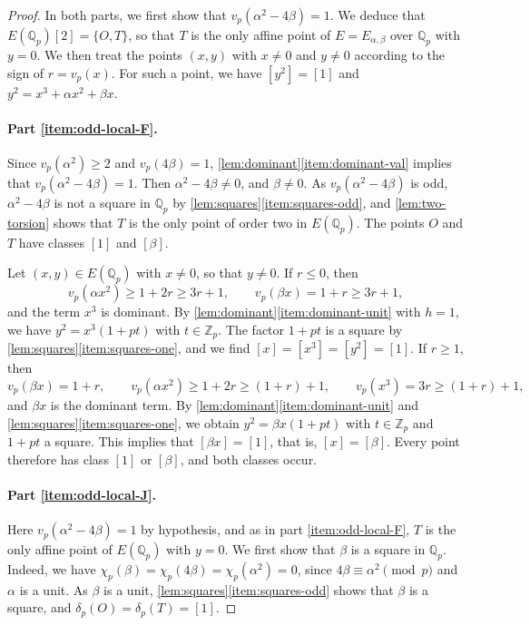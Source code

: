 \documentclass[12pt,oneside,openany]{book}
\theoremstyle{definition}
\theoremstyle{plain}
\numberwithin{equation}{chapter}
\theoremstyle{plain}
\theoremstyle{definition}
\theoremstyle{remark}
\newcommand{\Q}{\mathbb Q}
\newcommand{\Z}{\mathbb Z}
\newcommand{\sq}[1]{[#1]}
\begin{document}
\begin{proof}
In both parts, we first show that $v_p(\alpha^2-4\beta)=1$. We deduce that $E(\Q_p)[2]=\{O,T\}$, so that $T$ is the only affine point of $E=E_{\alpha,\beta}$ over $\Q_p$ with $y=0$. We then treat the points $(x,y)$ with $x\ne0$ and $y\ne0$ according to the sign of $r=v_p(x)$. For such a point, we have $\sq{y^2}=\sq1$ and $y^2=x^3+\alpha x^2+\beta x$.

\paragraph{Part \ref{item:odd-local-F}.} Since $v_p(\alpha^2)\ge2$ and $v_p(4\beta)=1$, \cref{lem:dominant}\ref{item:dominant-val} implies that $v_p(\alpha^2-4\beta)=1$. Then $\alpha^2-4\beta\ne0$, and $\beta\ne0$. As $v_p(\alpha^2-4\beta)$ is odd, $\alpha^2-4\beta$ is not a square in $\Q_p$ by \cref{lem:squares}\ref{item:squares-odd}, and \cref{lem:two-torsion} shows that $T$ is the only point of order two in $E(\Q_p)$. The points $O$ and $T$ have classes $\sq1$ and $\sq\beta$.

Let $(x,y)\in E(\Q_p)$ with $x\ne0$, so that $y\ne0$. If $r\le0$, then
\begin{equation}
v_p(\alpha x^2)\ge1+2r\ge3r+1,\qquad v_p(\beta x)=1+r\ge3r+1,
\end{equation}
and the term $x^3$ is dominant. By \cref{lem:dominant}\ref{item:dominant-unit} with $h=1$, we have $y^2=x^3(1+pt)$ with $t\in\Z_p$. The factor $1+pt$ is a square by \cref{lem:squares}\ref{item:squares-one}, and we find $\sq x=\sq{x^3}=\sq{y^2}=\sq1$. If $r\ge1$, then
\begin{equation}
v_p(\beta x)=1+r,\qquad v_p(\alpha x^2)\ge1+2r\ge(1+r)+1,\qquad v_p(x^3)=3r\ge(1+r)+1,
\end{equation}
and $\beta x$ is the dominant term. By \cref{lem:dominant}\ref{item:dominant-unit} and \cref{lem:squares}\ref{item:squares-one}, we obtain $y^2=\beta x(1+pt)$ with $t\in\Z_p$ and $1+pt$ a square. This implies that $\sq{\beta x}=\sq1$, that is, $\sq x=\sq\beta$. Every point therefore has class $\sq1$ or $\sq\beta$, and both classes occur.

\paragraph{Part \ref{item:odd-local-J}.} Here $v_p(\alpha^2-4\beta)=1$ by hypothesis, and as in part \ref{item:odd-local-F}, $T$ is the only affine point of $E(\Q_p)$ with $y=0$. We first show that $\beta$ is a square in $\Q_p$. Indeed, we have $\chi_p(\beta)=\chi_p(4\beta)=\chi_p(\alpha^2)=0$, since $4\beta\equiv\alpha^2\pmod p$ and $\alpha$ is a unit. As $\beta$ is a unit, \cref{lem:squares}\ref{item:squares-odd} shows that $\beta$ is a square, and $\delta_p(O)=\delta_p(T)=\sq1$.


\end{proof}
\end{document}
